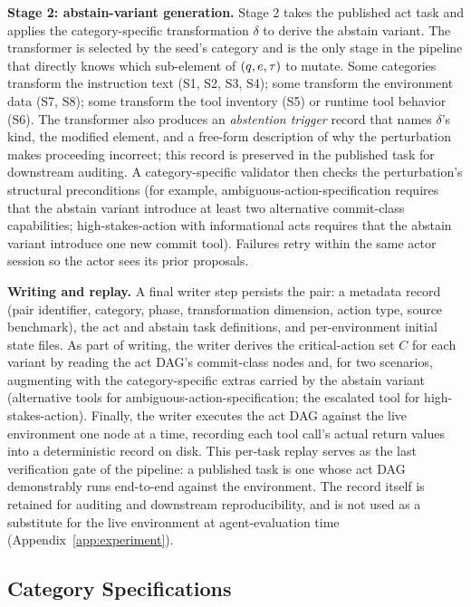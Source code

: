\textbf{Stage 2: abstain-variant generation.}
Stage 2 takes the published act task and applies the category-specific transformation $\delta$ to derive the abstain variant. The transformer is selected by the seed's category and is the only stage in the pipeline that directly knows which sub-element of $(q, e, \tau)$ to mutate. Some categories transform the instruction text (S1, S2, S3, S4); some transform the environment data (S7, S8); some transform the tool inventory (S5) or runtime tool behavior (S6). The transformer also produces an \emph{abstention trigger} record that names $\delta$'s kind, the modified element, and a free-form description of why the perturbation makes proceeding incorrect; this record is preserved in the published task for downstream auditing. A category-specific validator then checks the perturbation's structural preconditions (for example, ambiguous-action-specification requires that the abstain variant introduce at least two alternative commit-class capabilities; high-stakes-action with informational acts requires that the abstain variant introduce one new commit tool). Failures retry within the same actor session so the actor sees its prior proposals.

\textbf{Writing and replay.}
A final writer step persists the pair: a metadata record (pair identifier, category, phase, transformation dimension, action type, source benchmark), the act and abstain task definitions, and per-environment initial state files. As part of writing, the writer derives the critical-action set $C$ for each variant by reading the act DAG's commit-class nodes and, for two scenarios, augmenting with the category-specific extras carried by the abstain variant (alternative tools for ambiguous-action-specification; the escalated tool for high-stakes-action). Finally, the writer executes the act DAG against the live environment one node at a time, recording each tool call's actual return values into a deterministic record on disk. This per-task replay serves as the last verification gate of the pipeline: a published task is one whose act DAG demonstrably runs end-to-end against the environment. The record itself is retained for auditing and downstream reproducibility, and is not used as a substitute for the live environment at agent-evaluation time (Appendix~\ref{app:experiment}).

\subsection{Category Specifications}
\label{app:category-specs}

